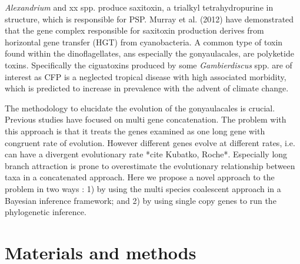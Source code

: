\documentclass[12pt]{article}
\begin{document}
\emph{Alexandrium} and xx spp. produce saxitoxin, a trialkyl tetrahydropurine in structure, which is responsible for PSP. Murray et al. (2012) have demonstrated that the gene complex responsible for saxitoxin production derives from horizontal gene transfer (HGT) from cyanobacteria.
A common type of toxin found within the dinoflagellates, ans especially the gonyaulacales, are polyketide toxins. Specifically the ciguatoxins produced by some \emph{Gambierdiscus} spp. are of interest as CFP is a neglected tropical disease with high associated morbidity, which is predicted to increase in prevalence with the advent of climate change.





The methodology to elucidate the evolution of the gonyaulacales is crucial. Previous studies have focused on multi gene concatenation. The problem with this approach is that it treats the genes examined as one long gene with congruent rate of evolution. However different genes evolve at different rates, i.e. can have a divergent evolutionary rate *cite Kubatko, Roche*. Especially long branch attraction is prone to overestimate the evolutionary relationship between taxa in a concatenated approach. Here we propose a novel approach to the problem in two ways : 1) by using the multi species coalescent approach in a Bayesian inference framework; and 2) by using single copy genes to run the phylogenetic inference.

\newpage

\section{Materials and methods}
\end{document}
